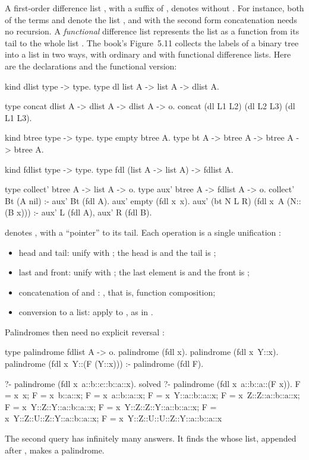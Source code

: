 A first-order difference list , with  a suffix of , denotes  without
. For instance, both of the terms
 and 
denote the list , and with the second form concatenation needs no recursion. A \emph{functional}
difference list represents the list as a function
from its tail to the whole list . The book's Figure~5.11 collects the labels of a
binary tree into a list in two ways, with ordinary and with functional difference lists. Here are the
declarations and the functional version:
\begin{lprolog}
kind dlist    type -> type.
type dl       list A -> list A -> dlist A.

type concat   dlist A -> dlist A -> dlist A -> o.
concat (dl L1 L2) (dl L2 L3) (dl L1 L3).

kind btree    type -> type.
type empty    btree A.
type bt       A -> btree A -> btree A -> btree A.

kind fdlist   type -> type.
type fdl      (list A -> list A) -> fdlist A.

type collect'  btree A -> list A -> o.
type aux'      btree A -> fdlist A -> o.
collect' Bt (A nil) :- aux' Bt (fdl A).
aux' empty (fdl x\ x).
aux' (bt N L R) (fdl x\ A (N::(B x))) :- aux' L (fdl A),
                                         aux' R (fdl B).
\end{lprolog}
 denotes , with a ``pointer'' to its tail. Each operation is
a single unification :
\begin{itemize}
\item head and tail: unify with ; the head is  and the tail is ;
\item last and front: unify with ; the last element is  and the front is ;
\item concatenation of  and : , that is, function composition;
\item conversion to a list: apply to , as  in .
\end{itemize}
Palindromes then need no explicit reversal :
\begin{lprolog}
type palindrome   fdlist A -> o.
palindrome (fdl x\x).
palindrome (fdl x\ Y::x).
palindrome (fdl x\ Y::(F (Y::x))) :- palindrome (fdl F).
\end{lprolog}
\begin{lprolog}
?- palindrome (fdl x\ a::b::c::b::a::x).
solved
?- palindrome (fdl x\ a::b::a::(F x)).
F = x\ x;
F = x\ b::a::x;
F = x\ a::b::a::x;
F = x\ Y::a::b::a::x;
F = x\ Z::Z::a::b::a::x;
F = x\ Y::Z::Y::a::b::a::x;
F = x\ Y::Z::Z::Y::a::b::a::x;
F = x\ Y::Z::U::Z::Y::a::b::a::x;
F = x\ Y::Z::U::U::Z::Y::a::b::a::x
\end{lprolog}
The second query has infinitely many answers. It finds the  whose list, appended after
, makes a palindrome.

